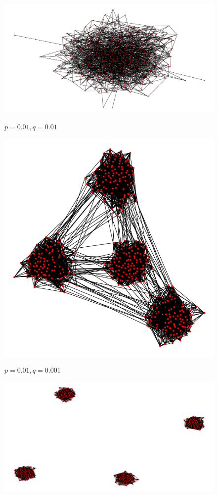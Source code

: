 \documentclass[a4paper]{report}
\begin{document}
\begin{center}
  \begin{figure}[!h]
    \centering
    \includegraphics[width=0.3\paperwidth]{assets/0101.png}\\
    \caption*{$p=0.01, q=0.01$}
  \end{figure}
  \begin{figure}[!h]
    \centering
    \includegraphics[width=0.3\paperwidth]{assets/01001.png}\\
    \caption*{$p=0.01, q=0.001$}
  \end{figure}
  \begin{figure}[!h]
    \centering
    \includegraphics[width=0.3\paperwidth]{assets/01000001.png}\\

\end{figure}
\end{center}
\end{document}
